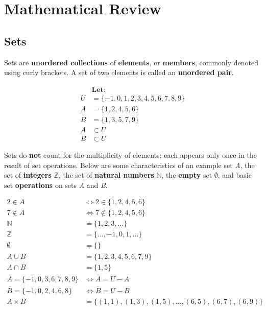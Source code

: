 \section{Mathematical Review}

\subsection{Sets}

\hspace{2em} Sets are \textbf{unordered collections} of \textbf{elements}, or \textbf{members}, commonly denoted using curly brackets. 
A set of two elements is called an \textbf{unordered pair}.
\begin{center}
    \begin{minipage}{0.5\textwidth}
    \begin{align*}
        &\textbf{Let:}\\
        U &= \{-1, 0, 1, 2, 3, 4, 5, 6, 7, 8, 9\}\\
        A &= \{1, 2, 4, 5, 6\}\\
        B &= \{1, 3, 5, 7, 9\}\\
        A &\subset U\\
        B &\subset U
    \end{align*}
    \end{minipage}
\end{center}

Sets do \textbf{not} count for the multiplicity of elements; each appears only once in the result of set operations. Below are 
some characteristics of an example set \textit{A}, the set of \textbf{integers} $\mathbb{Z}$, the set of \textbf{natural numbers}
$\mathbb{N}$, the \textbf{empty} set $\emptyset$, and basic set \textbf{operations} on sets \textit{A} and \textit{B}.

\begin{center}
    \begin{minipage}{0.75\textwidth} %
    \begin{align*}
        2 \in A &\iff 2 \in \{1, 2, 4, 5, 6\}\\
        7 \notin A &\iff 7 \notin\{1, 2, 4, 5, 6\}\\
        \mathbb{N} &= \{1, 2, 3, \ldots\}\\
        \mathbb{Z} &= \{\ldots,-1, 0, 1, \ldots\}\\
        \emptyset &= \{\}\\
        A \cup B &= \{1, 2, 3, 4, 5, 6, 7, 9\}\\
        A \cap B &= \{1, 5\}\\
        \overline{A} = \{-1, 0, 3, 6, 7, 8, 9\} &\iff \overline{A} = U - A\\
        \overline{B} = \{-1, 0, 2, 4, 6, 8\} &\iff \overline{B} = U - B\\
        A \times B &= \{(1, 1), (1, 3), (1, 5), \ldots, (6, 5), (6, 7), (6, 9)\}
    \end{align*}
    \end{minipage}
\end{center}

